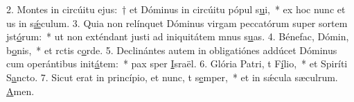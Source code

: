 2. Montes in circúitu ejus:~† et Dóminus in circúitu pópul s\uline{u}i,~* ex hoc nunc et us in s\uline{ǽ}culum.
3. Quia non relínquet Dóminus virgam peccatórum super sortem jst\uline{ó}rum:~* ut non exténdant justi ad iniquitátem mnus s\uline{u}as.
4. Bénefac, Dómin, b\uline{o}nis,~* et rctis c\uline{o}rde.
5. Declinántes autem in obligatiónes addúcet Dóminus cum operántibus init\uline{á}tem:~* pax sper \uline{I}sraël.
6. Glória Patri, t F\uline{í}lio,~* et Spiríti S\uline{a}ncto.
7. Sicut erat in princípio, et nunc, t s\uline{e}mper,~* et in sǽcula sæculrum. \uline{A}men.
